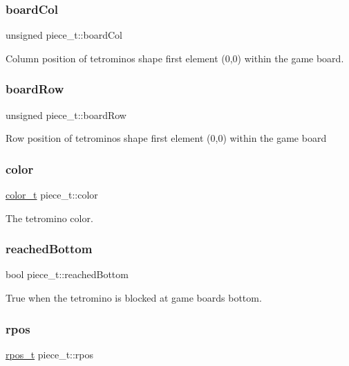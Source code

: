 \subsubsection{\texorpdfstring{board\+Col}{boardCol}}
{\footnotesize\ttfamily unsigned piece\+\_\+t\+::board\+Col}

Column position of tetromino\textquotesingle{}s shape first element (0,0) within the game board. \mbox{\label{structpiece__t_a14640fd68c44e80eacbe6adbf8597829}} 
\subsubsection{\texorpdfstring{board\+Row}{boardRow}}
{\footnotesize\ttfamily unsigned piece\+\_\+t\+::board\+Row}

Row position of tetromino\textquotesingle{}s shape first element (0,0) within the game board \mbox{\label{structpiece__t_af6408bda8899430d6457a83afb657225}} 
\subsubsection{\texorpdfstring{color}{color}}
{\footnotesize\ttfamily \hyperlink{TetreesDefs_8hpp_a8ba5fbce2446135735693ab60c896bbd}{color\+\_\+t} piece\+\_\+t\+::color}

The tetromino color. \mbox{\label{structpiece__t_acb67c9322e157b7dd7c7e0efd212da76}} 
\subsubsection{\texorpdfstring{reached\+Bottom}{reachedBottom}}
{\footnotesize\ttfamily bool piece\+\_\+t\+::reached\+Bottom}

True when the tetromino is blocked at game board\textquotesingle{}s bottom. \mbox{\label{structpiece__t_ab1d715c35231b557560096e2d79f4a43}} 
\subsubsection{\texorpdfstring{rpos}{rpos}}
{\footnotesize\ttfamily \hyperlink{TetreesDefs_8hpp_ae8c3bf9765f183eabf1106110513afc6}{rpos\+\_\+t} piece\+\_\+t\+::rpos}

